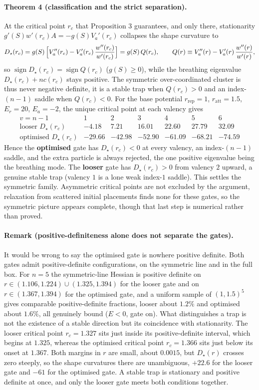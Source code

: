 \documentclass[11pt]{article}
\begin{document}
\paragraph{Theorem 4 (classification and the strict separation).}
At the critical point $r_c$ that Proposition 3 guarantees, and only there, stationarity
$g'(S)w'(r_c)A=-g(S)V_a'(r_c)$ collapses the shape curvature to
\[
D_\star(r_c)=g(S)\,\Bigl[V_a''(r_c)-V_a'(r_c)\,\frac{w''(r_c)}{w'(r_c)}\Bigr]=g(S)\,Q(r_c),
\qquad Q(r)\equiv V_a''(r)-V_a'(r)\,\frac{w''(r)}{w'(r)} ,
\]
so $\operatorname{sign}D_\star(r_c)=\operatorname{sign}Q(r_c)$ ($g(S)\ge0$), while the breathing
eigenvalue $D_\star(r_c)+nc(r_c)$ stays positive. The symmetric over-coordinated cluster is thus
never negative definite, it is a stable trap when $Q(r_c)>0$ and an index-$(n-1)$ saddle when
$Q(r_c)<0$. For the base potential $r_{\mathrm{rep}}=1$, $r_{\mathrm{att}}=1.5$, $E_r=20$,
$E_a=-2$, the unique critical point at each valency gives
\[
\begin{array}{c|cccccc}
v=n-1 & 1 & 2 & 3 & 4 & 5 & 6\\\hline
\text{looser } D_\star(r_c)    & -4.18 & 7.21 & 16.01 & 22.60 & 27.79 & 32.09\\
\text{optimised } D_\star(r_c) & -29.66 & -42.98 & -52.90 & -61.09 & -68.21 & -74.59
\end{array}
\]
Hence the \textbf{optimised} gate has $D_\star(r_c)<0$ at every valency, an index-$(n-1)$
saddle, and the extra particle is always rejected, the one positive eigenvalue being the
breathing mode. The \textbf{looser} gate has $D_\star(r_c)>0$ from valency $2$ upward, a genuine
stable trap (valency $1$ is a lone weak index-$1$ saddle). This settles the symmetric family.
Asymmetric critical points are not excluded by the argument, relaxation from scattered initial
placements finds none for these gates, so the symmetric picture appears complete, though that
last step is numerical rather than proved.

\paragraph{Remark (positive-definiteness alone does not separate the gates).}
It would be wrong to say the optimised gate is nowhere positive definite. Both gates admit
positive-definite configurations, on the symmetric line and in the full box. For $n=5$ the
symmetric-line Hessian is positive definite on
$r\in(1.106,1.224)\cup(1.325,1.394)$ for the looser gate and on $r\in(1.367,1.394)$ for the
optimised gate, and a uniform sample of $(1,1.5)^5$ gives comparable positive-definite
fractions, looser about $1.2\%$ and optimised about $1.6\%$, all genuinely bound
($E<0$, gate on). What distinguishes a trap is not the existence of a stable direction but its
coincidence with stationarity. The looser critical point $r_c=1.327$ sits just inside its
positive-definite interval, which begins at $1.325$, whereas the optimised critical point
$r_c=1.366$ sits just below its onset at $1.367$. Both margins in $r$ are small, about $0.0015$,
but $D_\star(r)$ crosses zero steeply, so the shape curvatures there are unambiguous, $+22.6$ for
the looser gate and $-61$ for the optimised gate. A stable trap is stationary and positive
definite at once, and only the looser gate meets both conditions together.
\end{document}
